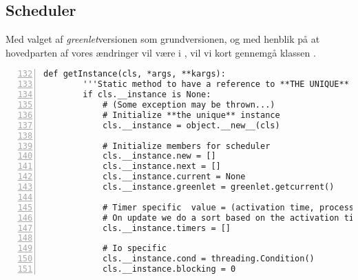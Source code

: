 \subsection{Scheduler}
Med valget af \emph{greenlet}versionen som grundversionen, og med henblik på at hovedparten af vores ændringer vil være i \sched, vil vi kort gennemgå klassen .

\begin{lstlisting}[firstnumber=132,stepnumber=5,numbers=left, float, label=fig:scheduling, caption=Uddrag af Scheduler.py i \emph{greenlets}versionen.]
    def getInstance(cls, *args, **kargs):
        '''Static method to have a reference to **THE UNIQUE** instance'''
        if cls.__instance is None:
            # (Some exception may be thrown...)
            # Initialize **the unique** instance
            cls.__instance = object.__new__(cls)

            # Initialize members for scheduler
            cls.__instance.new = []
            cls.__instance.next = []
            cls.__instance.current = None
            cls.__instance.greenlet = greenlet.getcurrent()

            # Timer specific  value = (activation time, process)
            # On update we do a sort based on the activation time
            cls.__instance.timers = []

            # Io specific
            cls.__instance.cond = threading.Condition()
            cls.__instance.blocking = 0
\end{lstlisting}

